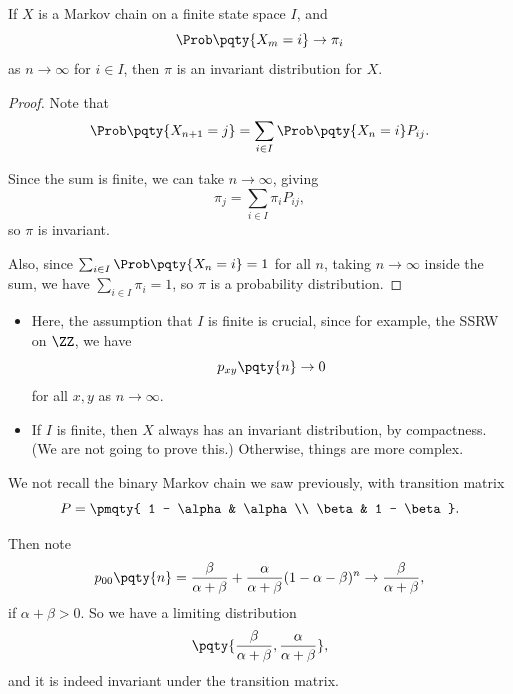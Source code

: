 \begin{theorem}
    If \(X\) is a Markov chain on a finite state space \(I\), and
    \[
        \Prob\pqty{X_m = i} \to \pi_i
    \]
    as \(n \to \infty\) for \(i \in I\), then \(\pi\) is an invariant distribution for \(X\).
\end{theorem}

\begin{proof}
    Note that
    \[
        \Prob\pqty{X_{n + 1} = j} = \sum_{i \in I} \Prob\pqty{X_n = i} P_{ij}.
    \]

    Since the sum is finite, we can take \(n \to \infty\), giving
    \[
        \pi_j = \sum_{i \in I} \pi_i P_{ij},
    \]
    so \(\pi\) is invariant.

    Also, since \(\sum_{i \in I} \Prob\pqty{X_n = i} = 1\) for all \(n\), taking \(n \to \infty\) inside the sum, we have \(\sum_{i \in I} \pi_i = 1\), so \(\pi\) is a probability distribution.
\end{proof}

\begin{remarks}
    \begin{itemize}
        \item Here, the assumption that \(I\) is finite is crucial, since for example, the SSRW on \(\ZZ\), we have
        \[
            p_{xy} \pqty{n} \to 0
        \]
        for all \(x, y\) as \(n \to \infty\).

        \item If \(I\) is finite, then \(X\) always has an invariant distribution, by compactness. (We are not going to prove this.) Otherwise, things are more complex.
    \end{itemize}
\end{remarks}

\begin{example}
    We not recall the binary Markov chain we saw previously, with transition matrix
    \[
        P = \pmqty{
            1 - \alpha & \alpha \\
            \beta & 1 - \beta
        }.
    \]

    Then note
    \[
        p_{00} \pqty{n} = \frac{\beta}{\alpha + \beta} + \frac{\alpha}{\alpha + \beta} (1 - \alpha - \beta)^n \to \frac{\beta}{\alpha + \beta},
    \]
    if \(\alpha + \beta > 0\). So we have a limiting distribution
    \[
        \pqty{\frac{\beta}{\alpha + \beta}, \frac{\alpha}{\alpha + \beta}},
    \]
    and it is indeed invariant under the transition matrix.
\end{example}

